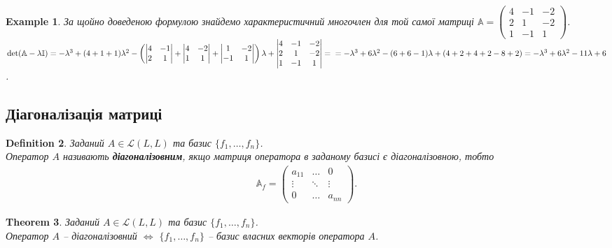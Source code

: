 \documentclass[a4paper, 10pt]{article}
\theoremstyle{theoremdd}
\newtheorem{theorem}{Theorem}[subsection]
\newtheorem{definition}[theorem]{Definition}
\newtheorem{example}[theorem]{Example}
\begin{document}
\begin{example}
За щойно доведеною формулою знайдемо характеристичний многочлен для той самої матриці $\mathbb{A} = \begin{pmatrix}
4 & -1 & -2 \\
2 & 1 & -2 \\
1 & -1 & 1
\end{pmatrix}$.\\
$\det (\mathbb{A} - \lambda \mathbb{I}) = -\lambda^3 + (4+1+1)\lambda^2 - \left( \begin{vmatrix}
4 & -1 \\
2 & 1
\end{vmatrix} + \begin{vmatrix}
4 & -2 \\
1 & 1
\end{vmatrix} + \begin{vmatrix}
1 & -2 \\
-1 & 1
\end{vmatrix} \right) \lambda + \begin{vmatrix}
4 & -1 & -2 \\
2 & 1 & -2 \\
1 & -1 & 1
\end{vmatrix} = \\
=-\lambda^3 + 6\lambda^2 - (6+6-1)\lambda + (4+2+4+2-8+2) = -\lambda^3 + 6\lambda^2 -11\lambda + 6$.
\end{example}

\subsection{Діагоналізація матриці}
\begin{definition}
Заданий $A \in \mathcal{L}(L,L)$ та базис $\{f_1,\dots,f_n\}$.\\
Оператор $A$ називають \textbf{діагоналізовним}, якщо матриця оператора в заданому базисі є діагоналізовною, тобто
\begin{align*}
\mathbb{A}_f = \begin{pmatrix}
a_{11} & \dots & 0 \\
\vdots & \ddots & \vdots \\
0 & \dots & a_{nn}
\end{pmatrix}.
\end{align*}
\end{definition}

\begin{theorem}
Заданий $A \in \mathcal{L}(L,L)$ та базис $\{f_1,\dots,f_n\}$.\\
Оператор $A$ -- діагоналізовний $\iff$ $\{f_1,\dots,f_n\}$ -- базис власних векторів оператора $A$.
\end{theorem}
\end{document}
